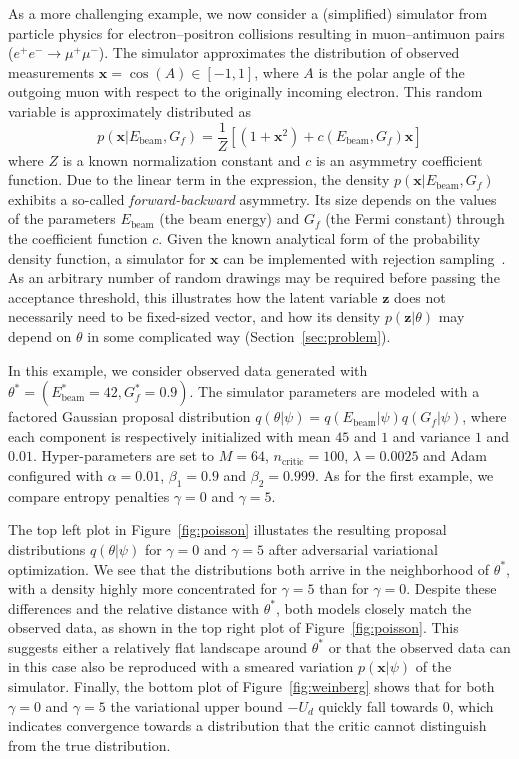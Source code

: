 \documentclass[twocolumn,superscriptaddress,aps]{revtex4-1}
\theoremstyle{plain}
\begin{document}
As a more challenging example, we now consider a (simplified) simulator from
particle physics for electron--positron collisions resulting in muon--antimuon
pairs ($e^+e^- \rightarrow \mu^+\mu^-$). The simulator approximates the
distribution of observed measurements $\mathbf{x} = \cos(A) \in [-1,1]$, where $A$ is the
polar angle of the outgoing muon with respect  to the originally incoming
electron. This random variable is approximately distributed as
\begin{equation}
    p(\mathbf{x}|E_\text{beam}, G_f) = \frac{1}{Z} \left[ (1 + \mathbf{x}^2) + c(E_\text{beam}, G_f) \mathbf{x} \right]
\end{equation}
where $Z$ is a known normalization constant and $c$ is an asymmetry coefficient
function. Due to the linear term in the expression, the density $p(\mathbf{x} |
E_\text{beam}, G_f)$ exhibits a so-called {\it forward-backward} asymmetry.  Its
size depends on the values of the parameters $E_\text{beam}$ (the beam energy)
and $G_f$ (the Fermi constant) through the coefficient function $c$. Given the
known analytical form of the probability density function, a simulator for
$\mathbf{x}$ can be implemented with rejection sampling~\citep{von195113}. As an
arbitrary number of random drawings may be required before passing the
acceptance threshold, this illustrates how the latent variable
$\mathbf{z}$ does not necessarily need to be fixed-sized vector, and how its
density  $p(\mathbf{z}|\theta)$ may depend on $\theta$ in some complicated way
(Section~\ref{sec:problem}).

In this example, we consider observed data generated with $\theta^* =
(E_\text{beam}^*=42, G_f^*=0.9)$. The simulator parameters are modeled with a
factored Gaussian proposal distribution $q(\theta|\psi) = q(E_\text{beam}|\psi)
q(G_f|\psi)$, where each component is respectively initialized with mean $45$
and $1$ and variance $1$ and $0.01$. Hyper-parameters are set to $M=64$,
$n_\text{critic}=100$, $\lambda=0.0025$ and Adam configured with $\alpha=0.01$,
$\beta_1=0.9$ and $\beta_2=0.999$. As for the first example, we compare
entropy penalties $\gamma=0$ and $\gamma=5$.

The top left plot in Figure~\ref{fig:poisson} illustates the resulting proposal
distributions $q(\theta|\psi)$ for $\gamma=0$ and $\gamma=5$ after adversarial
variational optimization. We see that the distributions both arrive in the
neighborhood of $\theta^*$, with a density highly more concentrated for
$\gamma=5$ than for $\gamma=0$.  Despite these differences and the relative
distance with $\theta^*$, both models closely match the observed data, as shown
in the top right plot of  Figure~\ref{fig:poisson}. This suggests either a
relatively flat landscape around $\theta^*$ or that the observed data can in
this case also be reproduced with a smeared variation $p(\mathbf{x}|\psi)$ of
the simulator. Finally, the bottom plot of Figure~\ref{fig:weinberg} shows that
for both $\gamma=0$ and $\gamma=5$ the variational upper bound $-U_d$ quickly
fall towards $0$, which indicates  convergence towards a distribution that the
critic cannot distinguish from the true distribution.
\end{document}
